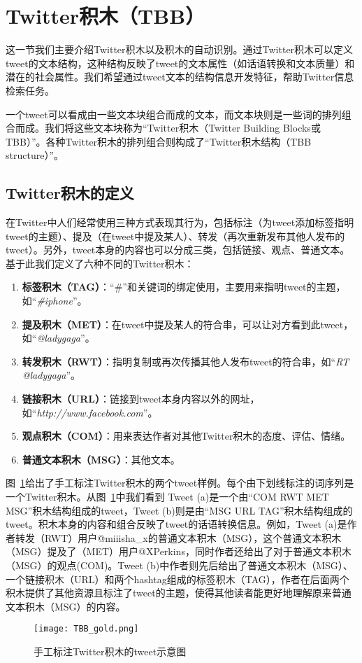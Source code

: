 \section{Twitter积木（TBB）}
这一节我们主要介绍Twitter积木以及积木的自动识别。通过Twitter积木可以定义tweet的文本结构，这种结构反映了tweet的文本属性（如话语转换和文本质量）和潜在的社会属性。我们希望通过tweet文本的结构信息开发特征，帮助Twitter信息检索任务。

一个tweet可以看成由一些文本块组合而成的文本，而文本块则是一些词的排列组合而成。我们将这些文本块称为“Twitter积木（Twitter Building Blocks或TBB）”。各种Twitter积木的排列组合则构成了“Twitter积木结构（TBB structure）”。

\subsection{Twitter积木的定义}
在Twitter中人们经常使用三种方式表现其行为，包括标注（为tweet添加标签指明tweet的主题）、提及（在tweet中提及某人）、转发（再次重新发布其他人发布的tweet）。另外，tweet本身的内容也可以分成三类，包括链接、观点、普通文本。基于此我们定义了六种不同的Twitter积木：
  \begin{enumerate}
  \item {\bf 标签积木（TAG）}：“\#”和关键词的绑定使用，主要用来指明tweet的主题，如“\emph{\#iphone}”。
  \item {\bf 提及积木（MET）}：在tweet中提及某人的符合串，可以让对方看到此tweet，如“\emph{@ladygaga}”。
  \item {\bf 转发积木（RWT）}：指明复制或再次传播其他人发布tweet的符合串，如“\emph{RT @ladygaga}”。
  \item {\bf 链接积木（URL）}：链接到tweet本身内容以外的网址，如“\emph{http://www.facebook.com}”。
  \item {\bf 观点积木（COM）}：用来表达作者对其他Twitter积木的态度、评估、情绪。
  \item {\bf 普通文本积木（MSG）}：其他文本。
  \end{enumerate}  

图~\ref{TBB_gold}给出了手工标注Twitter积木的两个tweet样例。每个由下划线标注的词序列是一个Twitter积木。从图~\ref{TBB_gold}中我们看到 Tweet (a)是一个由“COM RWT MET MSG”积木结构组成的tweet，Tweet (b)则是由“MSG URL TAG”积木结构组成的tweet。积木本身的内容和组合反映了tweet的话语转换信息。例如，Tweet (a)是作者转发（RWT）用户@miiisha\_x的普通文本积木（MSG），这个普通文本积木（MSG）提及了（MET）用户@XPerkins，同时作者还给出了对于普通文本积木（MSG）的观点(COM)。Tweet (b)中作者则先后给出了普通文本积木（MSG）、一个链接积木（URL）和两个hashtag组成的标签积木（TAG），作者在后面两个积木提供了其他资源且标注了tweet的主题，使得其他读者能更好地理解原来普通文本积木（MSG）的内容。
\begin{figure}[htp]
\centering
\texttt{[image: TBB\_gold.png]}
\caption{手工标注Twitter积木的tweet示意图}
\label{TBB_gold}
\end{figure}

